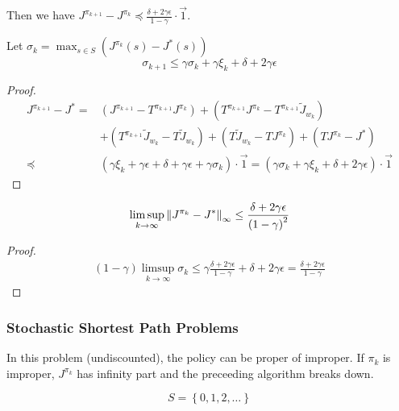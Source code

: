 Then we have $ J^{\pi_{k+1}} - J^{\pi_{k}} \preceq \frac{\delta + 2\gamma\epsilon}{1 - \gamma}\cdot \vec{1} $.\\

\begin{lemma}
Let $ \sigma_k = \max_{s \in S}\left( J^{\pi_k}(s) - J^{*}(s) \right) $
\[
    \sigma_{k+1} \le \gamma\sigma_k + \gamma\xi_k + \delta+2\gamma\epsilon
\]
\begin{proof}
\begin{align*}
    J^{\pi_{k+1}} - J^{*} =& (J^{\pi_{k+1}} - T^{\pi_{k+1}}J^{\pi_k}) + (T^{\pi_{k+1}}J^{\pi_k} - T^{\pi_{k+1}}\tilde J_{w_k}) \\
    &+ (T^{\pi_{k+1}} \tilde J_{w_k} - T \tilde J_{w_k}) +  (T \tilde J_{w_k}- T J^{\pi_k}) + (TJ^{\pi_k} - J^{*})\\
    \preceq& (\gamma \xi_k + \gamma\epsilon + \delta + \gamma\epsilon + \gamma \sigma_k) \cdot \vec{1}
    = (\gamma \sigma_k + \gamma\xi_k + \delta + 2\gamma\epsilon) \cdot \vec{1}
\end{align*}
\end{proof}
\end{lemma}

\begin{theorem}
    \[
        \limsup_{k \rightarrow \infty} {\Arrowvert J^{\pi_k} - J^{*} \Arrowvert}_\infty \le \frac{\delta + 2\gamma\epsilon}{{(1 - \gamma)}^2} 
    \]
    \begin{proof}
        \begin{align*}
            (1 - \gamma) \limsup_{k \rightarrow \infty} \sigma_k \le \gamma \frac{\delta + 2\gamma\epsilon}{1 - \gamma} + \delta + 2\gamma\epsilon = \frac{\delta + 2\gamma\epsilon}{1 - \gamma} 
        \end{align*}
    \end{proof}
\end{theorem}

\subsubsection*{Stochastic Shortest Path Problems}%

In this problem (undiscounted), the policy can be proper of improper. If $ \pi_k $ is improper, $ J^{\pi_k} $ has infinity part and the preceeding algorithm breaks down.

\[
    S = \left\{ 0, 1, 2, \ldots \right\}
\]

